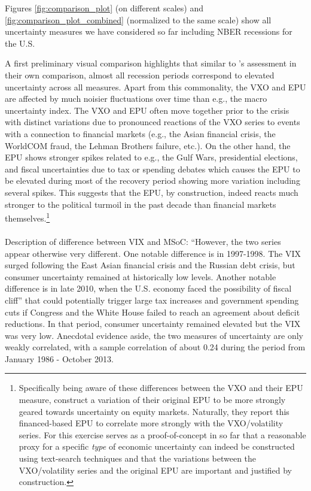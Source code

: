 \documentclass[a4paper,11pt,listof=nochaptergap,oneside,pointednumbers,bibtotoc,bigheadings,liststotoc]{scrbook}
\begin{document}
Figures \ref{fig:comparison_plot} (on different scales) and \ref{fig:comparison_plot_combined} (normalized to the same scale) show all uncertainty measures we have considered so far including NBER recessions for the U.S. 

A first preliminary visual comparison highlights that similar to \citet{bachmannetal:13}'s assessment in their own comparison, almost all recession periods correspond to elevated uncertainty across all measures. Apart from this commonality, the VXO and EPU are affected by much noisier fluctuations over time than e.g., the macro uncertainty index. The VXO and EPU often move together prior to the crisis with distinct variations due to pronounced reactions of the VXO series to events with a connection to financial markets (e.g., the Asian financial crisis, the WorldCOM fraud, the Lehman Brothers failure, etc.). On the other hand, the EPU shows stronger spikes related to e.g., the Gulf Wars, presidential elections, and fiscal uncertainties due to tax or spending debates which causes the EPU to be elevated during most of the recovery period showing more variation including several spikes. This suggests that the EPU, by construction, indeed reacts much stronger to the political turmoil in the past decade than financial markets themselves.\footnote{Specifically being aware of these differences between the VXO and their EPU measure, \citet{bakeretal:15} construct a variation of their original EPU to be more strongly geared towards uncertainty on equity markets. Naturally, they report this financed-based EPU to correlate more strongly with the VXO/volatility series. For \citet{bakeretal:15} this exercise serves as a proof-of-concept in so far that a reasonable proxy for a specific \textit{type} of economic uncertainty can indeed be constructed using text-search techniques and that the variations between the VXO/volatility series and the original EPU are important and justified by construction.} \\
\\
\begingroup
    \fontsize{8pt}{12pt}\selectfont
Description of difference between VIX and MSoC: ``However, the two series appear otherwise very different. One notable difference is in 1997-1998. The VIX surged following the East Asian financial crisis and the Russian debt crisis, but consumer uncertainty remained at historically low levels. Another notable difference is in late 2010, when the U.S. economy faced the possibility of  fiscal cliff'' that could potentially trigger large tax increases and government spending cuts if Congress and the White House failed to reach an agreement about deficit reductions. In that period, consumer uncertainty remained elevated but the VIX was very low. Anecdotal evidence aside, the two measures of uncertainty are only weakly correlated, with a sample correlation of about 0.24 during the period from January 1986 - October 2013.
\end{document}
